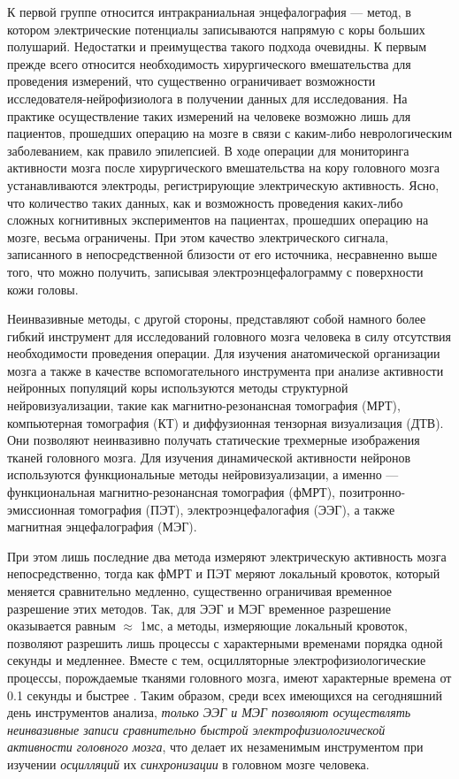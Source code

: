 К первой группе относится интракраниальная энцефалография --- метод,
в котором электрические потенциалы записываются напрямую с коры больших полушарий.
Недостатки и преимущества такого подхода очевидны. К первым прежде всего относится необходимость
хирургического вмешательства для проведения измерений, что существенно ограничивает возможности
исследователя-нейрофизиолога в получении данных для исследования.
На практике осуществление таких измерений на человеке возможно лишь для пациентов,
прошедших операцию на мозге в связи с каким-либо неврологическим заболеванием, как правило эпилепсией.
В ходе операции для мониторинга активности мозга после хирургического вмешательства на кору головного
мозга устанавливаются электроды, регистрирующие электрическую активность.
Ясно, что количество таких данных, как и  возможность проведения каких-либо сложных
когнитивных экспериментов на пациентах, прошедших операцию на мозге, весьма ограничены.
При этом качество электрического сигнала, записанного в непосредственной близости от его источника,
несравненно выше того, что можно получить, записывая электроэнцефалограмму с поверхности кожи головы.

Неинвазивные методы, с другой стороны, представляют собой намного более гибкий инструмент
для исследований головного мозга человека в силу отсутствия необходимости проведения операции.
Для изучения анатомической организации мозга а также в качестве вспомогательного инструмента
при анализе активности нейронных популяций коры используются методы структурной нейровизуализации,
такие как магнитно-резонансная томография (МРТ),
компьютерная томография (КТ) и диффузионная тензорная визуализация (ДТВ).
Они позволяют неинвазивно получать статические трехмерные изображения тканей головного мозга.
Для изучения динамической активности нейронов используются функциональные методы нейровизуализации,
а именно ---  функциональная магнитно-резонансная томография (фМРТ),
позитронно-эмиссионная томография (ПЭТ), электроэнцефалогафия (ЭЭГ), а также магнитная энцефалография (МЭГ).

При этом лишь последние два метода измеряют электрическую активность мозга непосредственно,
тогда как фМРТ и ПЭТ меряют локальный кровоток, который меняется сравнительно медленно,
существенно ограничивая временное разрешение этих методов.
Так, для ЭЭГ и МЭГ временное разрешение оказывается равным $\approx$ 1мс, а методы,
измеряющие локальный кровоток, позволяют разрешить лишь процессы с характерными временами
порядка одной секунды и медленнее. Вместе с тем, осцилляторные электрофизиологические процессы, порождаемые
тканями головного мозга, имеют характерные времена от 0.1 секунды и быстрее .
Таким образом, среди всех имеющихся на сегодняшний день инструментов анализа, \emph{только ЭЭГ и МЭГ
позволяют осуществлять неинвазивные записи сравнительно быстрой электрофизиологической
активности головного мозга}, что делает их незаменимым инструментом при изучении \emph{осцилляций}
их \emph{синхронизации} в головном мозге человека.

